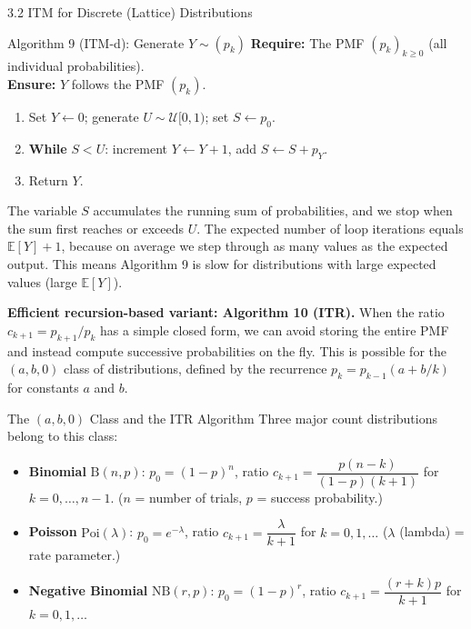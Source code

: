 \documentclass[aspectratio=169,10pt]{beamer}
\newcommand{\EE}{\mathbb{E}}
\newcommand{\UU}{\mathcal{U}}
\begin{document}
\begin{frame}[allowframebreaks]{3.2 ITM for Discrete (Lattice) Distributions}
\begin{alertblock}{Algorithm 9 (ITM-d): Generate $Y \sim (p_k)$}
  \textbf{Require:} The PMF $(p_k)_{k \ge 0}$ (all individual probabilities). \\
  \textbf{Ensure:} $Y$ follows the PMF $(p_k)$.
  \begin{enumerate}
    \item Set $Y \leftarrow 0$; generate $U \sim \UU[0,1)$; set $S \leftarrow p_0$.
    \item \textbf{While} $S < U$: increment $Y \leftarrow Y+1$, add $S \leftarrow S + p_Y$.
    \item Return $Y$.
  \end{enumerate}
  The variable $S$ accumulates the running sum of probabilities, and we stop
  when the sum first reaches or exceeds $U$.  The expected number of loop
  iterations equals $\EE[Y] + 1$, because on average we step through as many
  values as the expected output.  This means Algorithm 9 is slow for distributions
  with large expected values (large $\EE[Y]$).
\end{alertblock}

\textbf{Efficient recursion-based variant: Algorithm 10 (ITR).}
When the ratio $c_{k+1} = p_{k+1}/p_k$ has a simple closed form, we can avoid
storing the entire PMF and instead compute successive probabilities on the fly.
This is possible for the $(a,b,0)$ class of distributions, defined by the
recurrence $p_k = p_{k-1}(a + b/k)$ for constants $a$ and $b$.

\begin{block}{The $(a,b,0)$ Class and the ITR Algorithm}
  Three major count distributions belong to this class:
  \begin{itemize}
    \item \textbf{Binomial} $\mathrm{B}(n,p)$: $p_0 = (1-p)^n$,
          ratio $c_{k+1} = \dfrac{p(n-k)}{(1-p)(k+1)}$ for $k = 0,\ldots,n-1$.
          ($n$ = number of trials, $p$ = success probability.)
    \item \textbf{Poisson} $\mathrm{Poi}(\lambda)$: $p_0 = e^{-\lambda}$,
          ratio $c_{k+1} = \dfrac{\lambda}{k+1}$ for $k = 0,1,\ldots$
          ($\lambda$ (lambda) = rate parameter.)
    \item \textbf{Negative Binomial} $\mathrm{NB}(r,p)$: $p_0 = (1-p)^r$,
          ratio $c_{k+1} = \dfrac{(r+k)p}{k+1}$ for $k = 0,1,\ldots$
  \end{itemize}
\end{block}

\framebreak


\end{frame}
\end{document}
